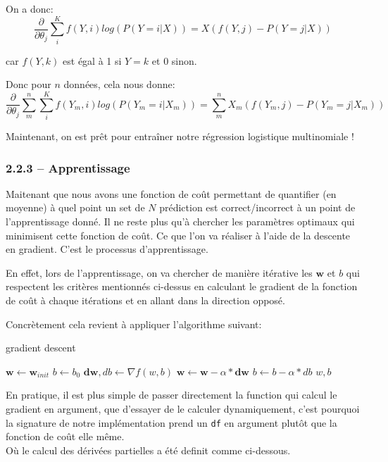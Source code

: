 \documentclass[
]{article}
\begin{document}
On a donc:
\[\frac{\partial}{\partial \theta_{j}} \sum_i^K f(Y, i)log(P(Y = i | X)) = X(f(Y, j) - P(Y = j|X))\]

car \(f(Y, k)\) est égal à 1 si \(Y = k\) et 0 sinon.

Donc pour \(n\) données, cela nous donne:
\[\frac{\partial}{\partial \theta_{j}} \sum_m^n \sum_i^K f(Y_m, i)log(P(Y_m = i | X_m)) = \sum_m^n X_m(f(Y_m, j) - P(Y_m = j|X_m))\]

Maintenant, on est prêt pour entraîner notre régression logistique
multinomiale !

\hypertarget{apprentissage}{%
\subsubsection{2.2.3 -- Apprentissage}\label{apprentissage}}

Maitenant que nous avons une fonction de coût permettant de quantifier
(en moyenne) à quel point un set de \(N\) prédiction est
correct/incorrect à un point de l'apprentissage donné. Il ne reste plus
qu'à chercher les paramètres optimaux qui minimisent cette fonction de
coût. Ce que l'on va réaliser à l'aide de la descente en gradient. C'est
le processus d'apprentissage.

En effet, lors de l'apprentissage, on va chercher de manière itérative
les \(\mathbf{w}\) et \(b\) qui respectent les critères mentionnés
ci-dessus en calculant le gradient de la fonction de coût à chaque
itérations et en allant dans la direction opposé.

Concrètement cela revient à appliquer l'algorithme suivant:

\begin{algorithm}
\caption{gradient descent}\label{alg:grad_desc}
\begin{algorithmic}
\State $\mathbf{w}\gets \mathbf{w}_{init}$
\State $b \gets b_0$
    \State $\mathbf{dw}, db \gets \nabla{f(w, b)} $
    \State $\mathbf{w}\gets \mathbf{w}- \alpha*\mathbf{dw}$
    \State $b \gets b - \alpha*db$
\EndFor
\State \Return $w, b$
\EndFunction
\end{algorithmic}
\end{algorithm}

En pratique, il est plus simple de passer directement la function qui
calcul le gradient en argument, que d'essayer de le calculer
dynamiquement, c'est pourquoi la signature de notre implémentation prend
un \texttt{df} en argument plutôt que la fonction de coût elle même.\\
Où le calcul des dérivées partielles a été definit comme ci-dessous.
\end{document}
